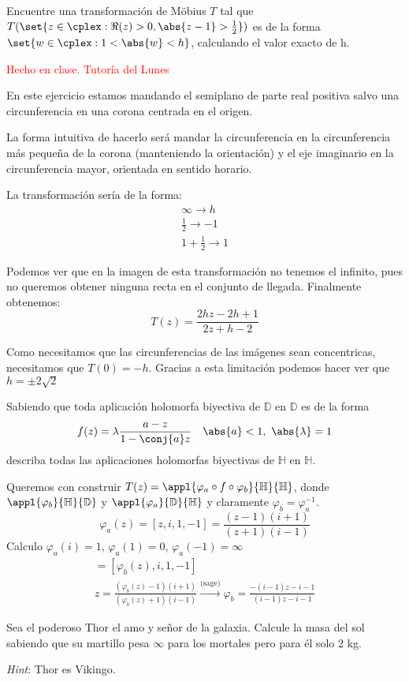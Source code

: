 \begin{problem}[11]
Encuentre una transformación de Möbius $T$ tal que $T(\set{z \in \cplex: \Re(z) > 0, \abs{z - 1} > \frac{1}{2}})$ es de la forma $\set{w \in \cplex: 1 < \abs{w} < h}$, calculando el valor exacto de h.
\solution

\textcolor{red}{Hecho en clase. Tutoría del Lunes}

En este ejercicio estamos mandando el semiplano de parte real positiva salvo una circunferencia en una corona centrada en el origen.

La forma intuitiva de hacerlo será mandar la circunferencia en la circunferencia más pequeña de la corona (manteniendo la orientación) y el eje imaginario en la circunferencia mayor, orientada en sentido horario.

La transformación sería de la forma:
\begin{align*}
	\infty \to h\\
	\frac{1}{2} \to -1\\
	1+\frac{1}{2} \to 1
\end{align*}

\obs Podemos ver que en la imagen de esta transformación no tenemos el infinito, pues no queremos obtener ninguna recta en el conjunto de llegada. Finalmente obtenemos:
\[T(z)=\frac{2hz-2h+1}{2z+h-2}\]

Como necesitamos que las circunferencias de las imágenes sean concentricas, necesitamos que $T(0)=-h$. Gracias a esta limitación podemos hacer ver que $h=\pm 2\sqrt{2}$

\end{problem}

\begin{problem}[12]

Sabiendo que toda aplicación holomorfa biyectiva de $\mathbb{D}$ en $\mathbb{D}$ es de la forma
\[ f(z) = \lambda \frac{a - z}{1 - \conj{a} z} \quad \abs{a} < 1, \ \abs{\lambda} = 1 \]
describa todas las aplicaciones holomorfas biyectivas de $\mathbb{H}$ en $\mathbb{H}$.
\solution
{}

Queremos con construir $T(z) = \appl{\varphi_a \circ f \circ \varphi_b}{\mathbb{H}}{\mathbb{H}}$, donde $\appl{\varphi_{b}}{\mathbb{H}}{\mathbb{D}}$ y $\appl{\varphi_{a}}{\mathbb{D}}{\mathbb{H}}$ y claramente $\varphi_{b} = \varphi_{a}^{-1}$.
\[ \varphi_{a}(z) = [z, i, 1, -1] = \frac{(z-1)(i+1)}{(z+1)(i-1)} \]
Calculo $\varphi_{a}(i) = 1$, $\varphi_{a}(1) = 0$, $\varphi_{a}(-1) = \infty$
\begin{gather*}
[z, \varphi_{a}(i), \varphi_{a}(1), \varphi_{a}(-1)] = [\varphi_{b}(z), i, 1, -1]\\
z = \frac{(\varphi_{b}(z) - 1) (i + 1)}{(\varphi_{b}(z)+1)(i-1)} \xrightarrow{\text{(sage)}}
\varphi_{b} = \frac{-(i - 1)z - i - 1}{(i - 1)z - i - 1}
\end{gather*}
\end{problem}

\begin{problem}[13]
Sea el poderoso Thor el amo y señor de la galaxia. Calcule la masa del sol sabiendo que su martillo pesa $\infty$ para los mortales pero para él solo 2 kg.

{\it Hint}: Thor es Vikingo.
\solution

\end{problem}
